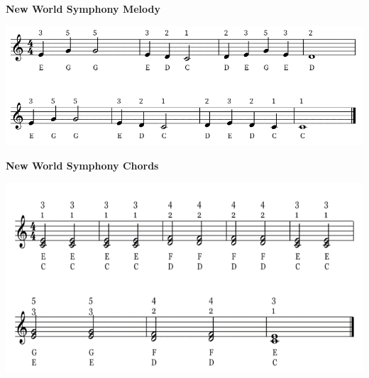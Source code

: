 \documentclass{article}
\begin{document}
\begin{landscape}

\begin{center}
    \fontsize{18}{22}\selectfont
    \textbf{New World Symphony Melody}
\end{center}

\vspace{3em}



\begin{center}
    
    \includegraphics[width=1.4\textwidth]{newworldmelody.png} %
\end{center}


    












\newpage
  \begin{center}
    \fontsize{18}{22}\selectfont
    \textbf{New World Symphony Chords}
  \end{center}

  \begin{center}
    \includegraphics[width=0.9\linewidth, height=0.8\linewidth, keepaspectratio]{newworldchords.png}
  \end{center}




\end{landscape}
\end{document}
